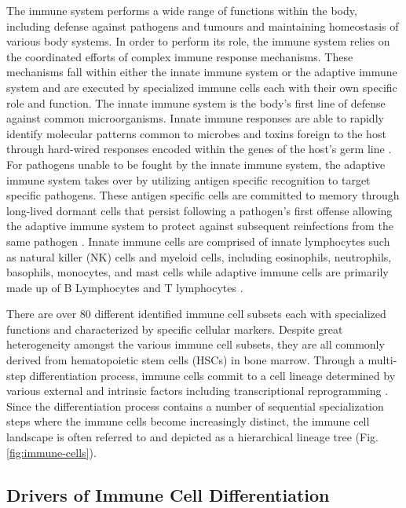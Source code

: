 The immune system performs a wide range of functions within the body, including defense against pathogens and tumours and maintaining homeostasis of various body systems. In order to perform its role, the immune system relies on the coordinated efforts of complex immune response mechanisms. These mechanisms fall within either the innate immune system or the adaptive immune system and are executed by specialized immune cells each with their own specific role and function. The innate immune system is the body's first line of defense against common microorganisms. Innate immune responses are able to rapidly identify molecular patterns common to microbes and toxins foreign to the host through hard-wired responses encoded within the genes of the host's germ line \cite{immunediff}. For pathogens unable to be fought by the innate immune system, the adaptive immune system takes over by utilizing antigen specific recognition to target specific pathogens. These antigen specific cells are committed to memory through long-lived dormant cells that persist following a pathogen's first offense allowing the adaptive immune system to protect against subsequent reinfections from the same pathogen \cite{immunediff, Janeway2001}. Innate immune cells are comprised of innate lymphocytes such as natural killer (NK) cells and myeloid cells, including eosinophils, neutrophils, basophils, monocytes, and mast cells while adaptive immune cells are primarily made up of B Lymphocytes and T lymphocytes \cite{Klinke2019}.

There are over 80 different identified immune cell subsets each with specialized functions and characterized by specific cellular markers. Despite great heterogeneity amongst the various immune cell subsets, they are all commonly derived from hematopoietic stem cells (HSCs) in bone marrow. Through a multi-step differentiation process, immune cells commit to a cell lineage determined by various external and intrinsic factors including transcriptional reprogramming \cite{Wang2018}. Since the differentiation process contains a number of sequential specialization steps where the immune cells become increasingly distinct, the immune cell landscape is often referred to and depicted as a hierarchical lineage tree \cite{Klinke2019} (Fig. \ref{fig:immune-cells}). 

\subsection{Drivers of Immune Cell Differentiation}

